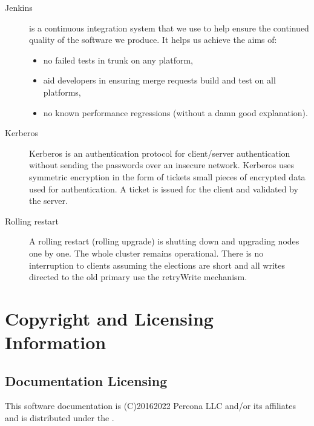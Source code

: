 \documentclass[letterpaper,10pt,english]{sphinxmanual}
\begin{document}
\begin{description}
\item[{Jenkins\label{\detokenize{glossary:term-Jenkins}}}] \leavevmode
\sphinxAtStartPar
{} is a continuous integration
system that we use to help ensure the continued quality of the
software we produce. It helps us achieve the aims of:
\begin{itemize}
\item {} 
\sphinxAtStartPar
no failed tests in trunk on any platform,

\item {} 
\sphinxAtStartPar
aid developers in ensuring merge requests build and test on all platforms,

\item {} 
\sphinxAtStartPar
no known performance regressions (without a damn good explanation).

\end{itemize}

\item[{Kerberos\label{\detokenize{glossary:term-Kerberos}}}] \leavevmode
\sphinxAtStartPar
Kerberos is an authentication protocol for client/server authentication without sending the passwords over an insecure network. Kerberos uses symmetric encryption in the form of tickets \sphinxhyphen{} small pieces of encrypted data used for authentication. A ticket is issued for the client and validated by the server.

\item[{Rolling restart\label{\detokenize{glossary:term-Rolling-restart}}}] \leavevmode
\sphinxAtStartPar
A rolling restart (rolling upgrade) is shutting down and upgrading nodes one by one. The whole cluster remains operational. There is no interruption to clients assuming the elections are short and all writes directed to the old primary use the retryWrite mechanism.

\end{description}


\chapter{Copyright and Licensing Information}
\label{\detokenize{copyright:copyright-and-licensing-information}}\label{\detokenize{copyright::doc}}

\section{Documentation Licensing}
\label{\detokenize{copyright:documentation-licensing}}
\sphinxAtStartPar
This software documentation is (C)2016\sphinxhyphen{}2022 Percona LLC and/or its affiliates
and is distributed under the .
\end{document}
